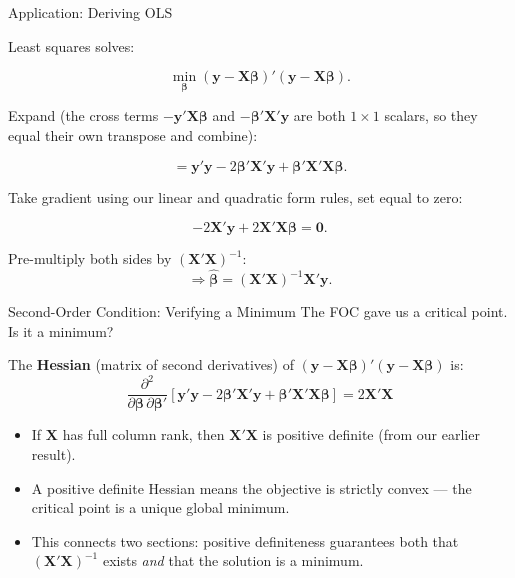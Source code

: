 \documentclass[aspectratio=169, handout, t]{beamer}
\numberwithin{equation}{section}
\begin{document}
\begin{frame}{Application: Deriving OLS}

Least squares solves:

\[
\min_{\bm{\beta}}
(\bm{y} - \bm{X}\bm{\beta})'
(\bm{y} - \bm{X}\bm{\beta}).
\]\pause

\vspace{0.3cm}

Expand (the cross terms $-\bm{y}'\bm{X}\bm{\beta}$ and $-\bm{\beta}'\bm{X}'\bm{y}$ are both $1\times 1$ scalars, so they equal their own transpose and combine):

\[
=
\bm{y}'\bm{y}
- 2\bm{\beta}'\bm{X}'\bm{y}
+ \bm{\beta}'\bm{X}'\bm{X}\bm{\beta}.
\]\pause

\vspace{0.3cm}

Take gradient using our linear and quadratic form rules, set equal to zero:

\[
-2\bm{X}'\bm{y}
+ 2\bm{X}'\bm{X}\bm{\beta}
= \bm{0}.
\]\pause

\vspace{0.2cm}

Pre-multiply both sides by $(\bm{X}'\bm{X})^{-1}$:
\[
\Rightarrow
\hat{\bm{\beta}} =
(\bm{X}'\bm{X})^{-1}\bm{X}'\bm{y}.
\]

\end{frame}

\begin{frame}{Second-Order Condition: Verifying a Minimum}
The FOC gave us a critical point.  Is it a minimum?\pause
\bigskip

The \textbf{Hessian} (matrix of second derivatives) of $(\bm{y}-\bm{X}\bm{\beta})'(\bm{y}-\bm{X}\bm{\beta})$ is:
$$\frac{\partial^2}{\partial \bm{\beta}\,\partial \bm{\beta}'}\left[\bm{y}'\bm{y}-2\bm{\beta}'\bm{X}'\bm{y}+\bm{\beta}'\bm{X}'\bm{X}\bm{\beta}\right]=2\bm{X}'\bm{X}$$\pause

\begin{itemize}
\item If $\bm{X}$ has full column rank, then $\bm{X}'\bm{X}$ is positive definite (from our earlier result).\pause
\item A positive definite Hessian means the objective is strictly convex --- the critical point is a unique global minimum.\pause
\item This connects two sections: positive definiteness guarantees both that $(\bm{X}'\bm{X})^{-1}$ exists \emph{and} that the solution is a minimum.
\end{itemize}
\end{frame}
\end{document}

